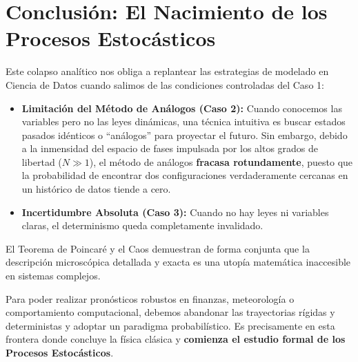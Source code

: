 \section{Conclusión: El Nacimiento de los Procesos Estocásticos}

Este colapso analítico nos obliga a replantear las estrategias de modelado en Ciencia de Datos cuando salimos de las condiciones controladas del Caso 1:

\begin{itemize}
    \item \textbf{Limitación del Método de Análogos (Caso 2):} Cuando conocemos las variables pero no las leyes dinámicas, una técnica intuitiva es buscar estados pasados idénticos o ``análogos'' para proyectar el futuro. Sin embargo, debido a la inmensidad del espacio de fases impulsada por los altos grados de libertad ($N \gg 1$), el método de análogos \textbf{fracasa rotundamente}, puesto que la probabilidad de encontrar dos configuraciones verdaderamente cercanas en un histórico de datos tiende a cero.
    \item \textbf{Incertidumbre Absoluta (Caso 3):} Cuando no hay leyes ni variables claras, el determinismo queda completamente invalidado.
\end{itemize}

El Teorema de Poincaré y el Caos demuestran de forma conjunta que la descripción microscópica detallada y exacta es una utopía matemática inaccesible en sistemas complejos. 

Para poder realizar pronósticos robustos en finanzas, meteorología o comportamiento computacional, debemos abandonar las trayectorias rígidas y deterministas y adoptar un paradigma probabilístico. Es precisamente en esta frontera donde concluye la física clásica y \textbf{comienza el estudio formal de los Procesos Estocásticos}.
